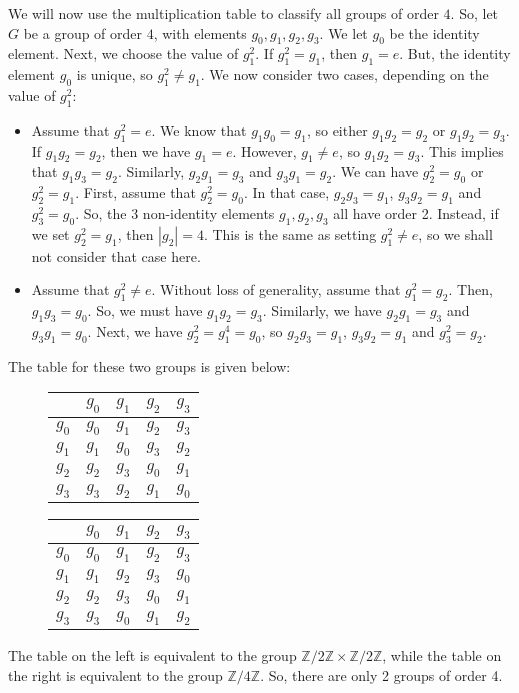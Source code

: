 \documentclass[a4paper, openany]{memoir}
\theoremstyle{definition}
\theoremstyle{plain}
\begin{document}
We will now use the multiplication table to classify all groups of order $4$. So, let $G$ be a group of order $4$, with elements $g_0, g_1, g_2, g_3$. We let $g_0$ be the identity element. Next, we choose the value of $g_1^2$. If $g_1^2 = g_1$, then $g_1 = e$. But, the identity element $g_0$ is unique, so $g_1^2 \neq g_1$. We now consider two cases, depending on the value of $g_1^2$:
\begin{itemize}
    \item Assume that $g_1^2 = e$. We know that $g_1g_0 = g_1$, so either $g_1g_2 = g_2$ or $g_1g_2 = g_3$. If $g_1g_2 = g_2$, then we have $g_1 = e$. However, $g_1 \neq e$, so $g_1g_2 = g_3$. This implies that $g_1g_3 = g_2$. Similarly, $g_2g_1 = g_3$ and $g_3g_1 = g_2$. We can have $g_2^2 = g_0$ or $g_2^2 = g_1$. First, assume that $g_2^2 = g_0$. In that case, $g_2g_3 = g_1$, $g_3g_2 = g_1$ and $g_3^2 = g_0$. So, the 3 non-identity elements $g_1, g_2, g_3$ all have order 2. Instead, if we set $g_2^2 = g_1$, then $|g_2| = 4$. This is the same as setting $g_1^2 \neq e$, so we shall not consider that case here.
    \item Assume that $g_1^2 \neq e$. Without loss of generality, assume that $g_1^2 = g_2$. Then, $g_1g_3 = g_0$. So, we must have $g_1g_2 = g_3$. Similarly, we have $g_2g_1 = g_3$ and $g_3g_1 = g_0$. Next, we have $g_2^2 = g_1^4 = g_0$, so $g_2g_3 = g_1$, $g_3g_2 = g_1$ and $g_3^2 = g_2$. 
\end{itemize}
The table for these two groups is given below:
\begin{figure}[H]
    \centering
    \begin{tabular}{c|cccc}
         & $g_0$ & $g_1$ & $g_2$ & $g_3$ \\
        \hline
        $g_0$ & $g_0$ & $g_1$ & $g_2$ & $g_3$ \\
        $g_1$ & $g_1$ & $g_0$ & $g_3$ & $g_2$ \\
        $g_2$ & $g_2$ & $g_3$ & $g_0$ & $g_1$ \\
        $g_3$ & $g_3$ & $g_2$ & $g_1$ & $g_0$
    \end{tabular}
    \hspace{20pt}
    \begin{tabular}{c|cccc}
         & $g_0$ & $g_1$ & $g_2$ & $g_3$ \\
        \hline
        $g_0$ & $g_0$ & $g_1$ & $g_2$ & $g_3$ \\
        $g_1$ & $g_1$ & $g_2$ & $g_3$ & $g_0$ \\
        $g_2$ & $g_2$ & $g_3$ & $g_0$ & $g_1$ \\
        $g_3$ & $g_3$ & $g_0$ & $g_1$ & $g_2$
    \end{tabular}
\end{figure}
\noindent The table on the left is equivalent to the group $\mathbb{Z}/2 \mathbb{Z} \times \mathbb{Z}/2 \mathbb{Z}$, while the table on the right is equivalent to the group $\mathbb{Z}/4 \mathbb{Z}$. So, there are only 2 groups of order 4.
\end{document}
